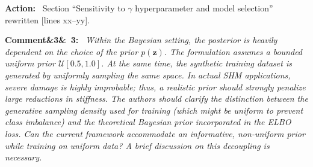 \documentclass[11pt]{article}
\newenvironment{rcomment}[1]{\par\bigskip\noindent\textbf{Comment\ifx&#1&\else\ #1\fi:}\ \itshape}{\par}
\newenvironment{action}{\par\smallskip\noindent\color{resp}\textbf{Action:}\ }{\par}
\newcommand{\tbd}[1]{\textcolor{note}{\textsf{[#1]}}}
\newcommand{\lines}[1]{\tbd{lines #1}}
\newcommand{\z}{\mathbf{z}}
\begin{document}
\begin{action}
Section ``Sensitivity to $\gamma$ hyperparameter and model selection'' rewritten \lines{xx--yy}.
\end{action}

\begin{rcomment}{3}
Within the Bayesian setting, the posterior is heavily dependent on the choice of the prior $p(\z)$. The formulation
assumes a bounded uniform prior $\mathcal{U}[0.5,1.0]$. At the same time, the synthetic training dataset is generated
by uniformly sampling the same space. In actual SHM applications, severe damage is highly improbable; thus, a realistic
prior should strongly penalize large reductions in stiffness. The authors should clarify the distinction between the
generative sampling density used for training (which might be uniform to prevent class imbalance) and the theoretical
Bayesian prior incorporated in the ELBO loss. Can the current framework accommodate an informative, non-uniform prior
while training on uniform data? A brief discussion on this decoupling is necessary.
\end{rcomment}
\end{document}
